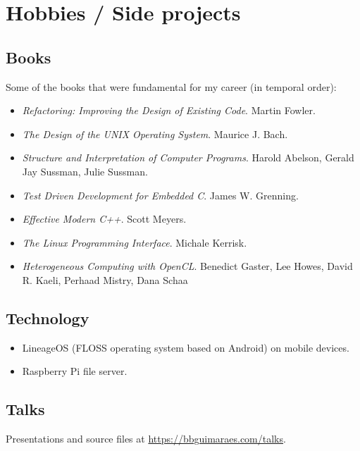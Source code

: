 \section*{Hobbies / Side projects}
\label{sec:etc}

\subsection*{Books}

Some of the books that were fundamental for my career (in temporal order):

\begin{itemize}
    \item
        \textit{Refactoring: Improving the Design of Existing Code}.
        Martin Fowler.
    \item
        \textit{The Design of the UNIX Operating System}.
        Maurice J. Bach.
    \item
        \textit{Structure and Interpretation of Computer Programs}.
        Harold Abelson, Gerald Jay Sussman, Julie Sussman.
    \item
        \textit{Test Driven Development for Embedded C}.
        James W. Grenning.
    \item
        \textit{Effective Modern C++}.
        Scott Meyers.
    \item
        \textit{The Linux Programming Interface}.
        Michale Kerrisk.
    \item
        \textit{Heterogeneous Computing with OpenCL}.
        Benedict Gaster, Lee Howes, David R. Kaeli, Perhaad Mistry, Dana Schaa
\end{itemize}

\subsection*{Technology}

\begin{itemize}
    \item
        LineageOS (FLOSS operating system based on Android) on mobile devices.
    \item Raspberry Pi file server.
\end{itemize}

\subsection*{Talks}

Presentations and source files at \url{https://bbguimaraes.com/talks}.


